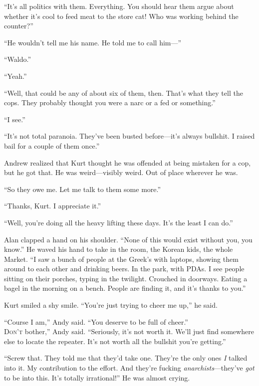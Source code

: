 \documentclass{article}
\begin{document}
``It's all politics with them.  Everything.  You should hear them
argue about whether it's cool to feed meat to the store cat!  Who was
working behind the counter?''

``He wouldn't tell me his name.  He told me to call him---''

``Waldo.''

``Yeah.''

``Well, that could be any of about six of them, then.  That's what
they tell the cops.  They probably thought you were a narc or a fed or
something.''

``I see.''

``It's not total paranoia.  They've been busted before---it's always
bullshit.  I raised bail for a couple of them once.''

Andrew realized that Kurt thought he was offended at being mistaken
for a cop, but he got that.  He was weird---visibly weird.  Out of
place wherever he was.

``So they owe me.  Let me talk to them some more.''

``Thanks, Kurt.  I appreciate it.''

``Well, you're doing all the heavy lifting these days.  It's the least
I can do.''

Alan clapped a hand on his shoulder.  ``None of this would exist
without you, you know.'' He waved his hand to take in the room, the
Korean kids, the whole Market.  ``I saw a bunch of people at the
Greek's with laptops, showing them around to each other and drinking
beers.  In the park, with PDAs.  I see people sitting on their
porches, typing in the twilight.  Crouched in doorways.  Eating a
bagel in the morning on a bench.  People are finding it, and it's
thanks to you.''

Kurt smiled a shy smile.  ``You're just trying to cheer me up,'' he
said.

``Course I am,'' Andy said.  ``You deserve to be full of cheer.''
\\
\lettrine[lines=3, lhang=.5, nindent=0pt, findent=2pt]{D}{on't}
bother,''
Andy said.  ``Seriously, it's not worth it.  We'll
just find somewhere else to locate the repeater.  It's not worth all
the bullshit you're getting.''

``Screw that.  They told me that they'd take one.  They're the only
ones \textit{I} talked into it.  My contribution to the effort.  And
they're fucking \textit{anarchists}---they've \textit{got} to be into
this.  It's totally irrational!'' He was almost crying.
\end{document}
